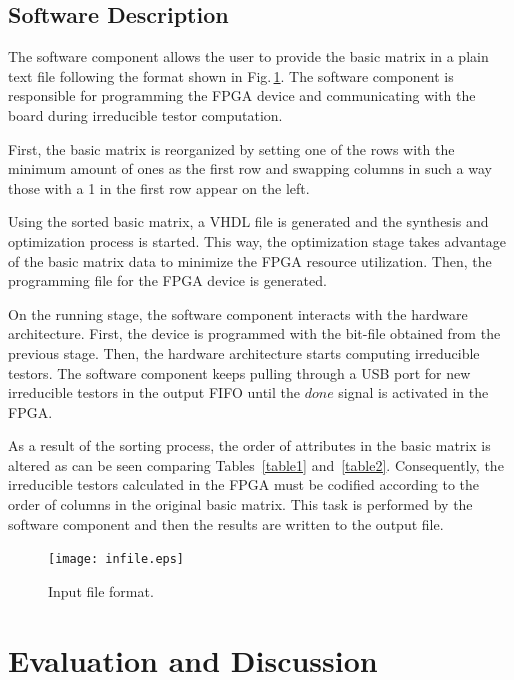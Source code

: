 \documentclass[authoryear,preprint,review,12pt]{elsarticle}
\begin{document}
\subsection{Software Description}
\label{sect:5}

The software component allows the user to provide the basic matrix in a 
plain text file following the format shown in Fig.\,\ref{fig:8}. The software component is responsible for 
programming the FPGA device and communicating with the board during irreducible testor computation.

First, the basic matrix is reorganized by setting one of the rows with the minimum amount of ones as the 
first row and swapping columns in such a way those with a 1 in the first row appear on the left. 

Using the sorted basic matrix, a VHDL file is generated and the synthesis and optimization process is started.
This way, the optimization stage takes advantage of the basic matrix data to minimize the FPGA resource 
utilization. Then, the programming file for the FPGA device is generated.

On the running stage, the software component interacts with the hardware architecture. 
First, the device is programmed with the bit-file obtained from the previous stage. Then, the
hardware architecture starts computing irreducible testors. 
The software component keeps pulling through a USB port for new irreducible testors in the output 
FIFO until the $done$ signal is activated in the FPGA.

As a result of the sorting process, the order of attributes in the basic matrix is altered as can 
be seen comparing Tables~\ref{table1} and~\ref{table2}. Consequently, the irreducible testors calculated 
in the FPGA must be codified according to the order of columns in the original basic matrix. This task 
is performed by the software component and then the results are written to the output file.

\begin{figure}[t]
    \begin{center}
        \texttt{[image: infile.eps]}
    \end{center}
\caption{Input file format.}
\label{fig:8}
\end{figure}

\section{Evaluation and Discussion}
\label{sect:6}
\end{document}
